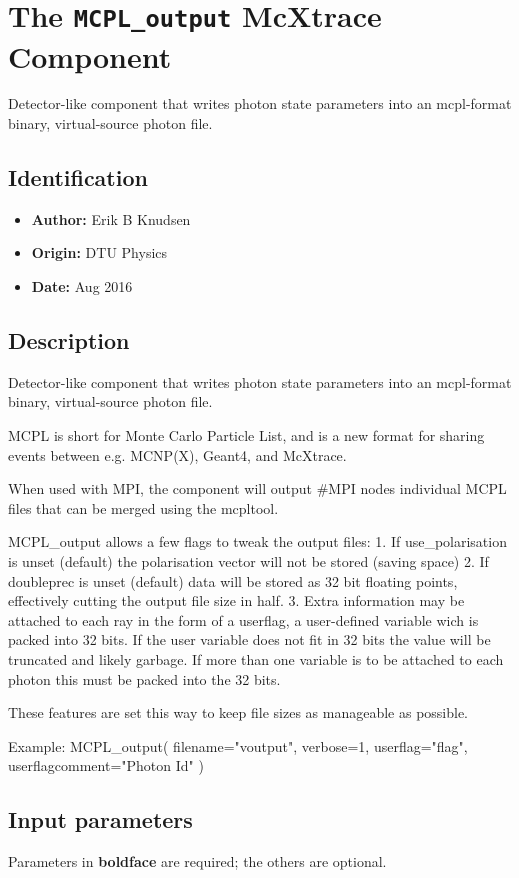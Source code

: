 \section{The \texttt{MCPL\_output} McXtrace Component}
Detector-like component that writes photon state parameters into an mcpl-format
binary, virtual-source photon file.

\subsection*{Identification}
\begin{itemize}
  \item \textbf{Author:} Erik B Knudsen
  \item \textbf{Origin:} DTU Physics
  \item \textbf{Date:} Aug 2016
\end{itemize}

\subsection*{Description}
Detector-like component that writes photon state parameters into an mcpl-format binary, virtual-source photon file.

MCPL is short for Monte Carlo Particle List, and is a new format for sharing events between e.g. MCNP(X), Geant4, and McXtrace.

When used with MPI, the component will output \#MPI nodes individual MCPL files that can be merged using the mcpltool.

MCPL\_output allows a few flags to tweak the output files: 1. If use\_polarisation is unset (default) the polarisation vector will not be stored (saving space) 2. If doubleprec is unset (default) data will be stored as 32 bit floating points, effectively cutting the output file size in half. 3. Extra information may be attached to each ray in the form of a userflag, a user-defined variable wich is packed into 32 bits. If the user variable does not fit in 32 bits the value will be truncated and likely garbage. If more than one variable is to be attached to each photon this must be packed into the 32 bits.

These features are set this way to keep file sizes as manageable as possible.

Example: MCPL\_output( filename="voutput", verbose=1, userflag="flag", userflagcomment="Photon Id" )

\subsection*{Input parameters}
Parameters in \textbf{boldface} are required; the others are optional.

